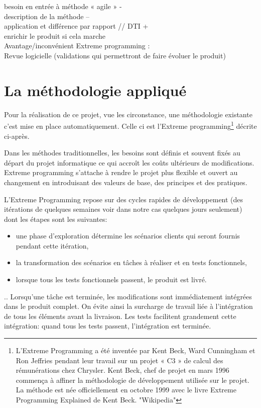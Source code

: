besoin en entrée à méthode « agile » - \\
description de la méthode – \\
application et différence par rapport // DTI +\\
enrichir le produit si cela marche\\
Avantage/inconvénient Extreme programming :\\
Revue logicielle (validations qui permettront de faire évoluer le produit)

\section{La méthodologie appliqué}
Pour la réalisation de ce projet, vue les circonstance, une méthodologie existante c'est mise en place automatiquement. Celle ci est l'Extreme programming\footnote{L'Extreme Programming a été inventée par Kent Beck, Ward Cunningham et Ron Jeffries pendant leur travail sur un projet « C3 » de calcul des rémunérations chez Chrysler. Kent Beck, chef de projet en mars 1996 commença à affiner la méthodologie de développement utilisée sur le projet. La méthode est née officiellement en octobre 1999 avec le livre Extreme Programming Explained de Kent Beck. "Wikipedia"} décrite ci-après.

Dans les méthodes traditionnelles, les besoins sont définis et souvent fixés au départ du projet informatique ce qui accroît les coûts ultérieurs de modifications. Extreme programming s'attache à rendre le projet plus flexible et ouvert au changement en introduisant des valeurs de base, des principes et des pratiques.

L'Extreme Programming repose sur des cycles rapides de développement (des itérations de quelques semaines voir dans notre cas quelques jours seulement) dont les étapes sont les suivantes:
\begin{itemize}
\item une phase d'exploration détermine les scénarios clients qui seront fournis pendant cette itération,
\item la transformation des scénarios en tâches à réaliser et en tests fonctionnels,
\item lorsque tous les tests fonctionnels passent, le produit est livré.
\end{itemize}
..
Lorsqu'une tâche est terminée, les modifications sont immédiatement intégrées dans le produit complet. On évite ainsi la surcharge de travail liée à l'intégration de tous les éléments avant la livraison. Les tests facilitent grandement cette intégration: quand tous les tests passent, l'intégration est terminée.

